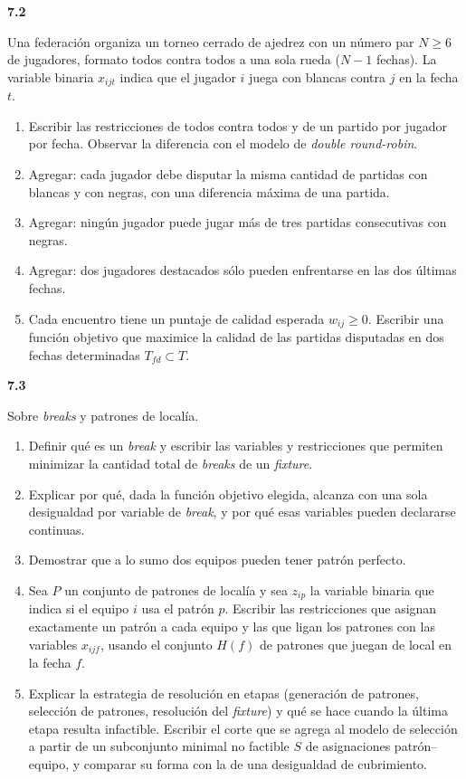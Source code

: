 \documentclass[11pt,a4paper]{article}
\newcommand{\ejercicio}[1]{\par\medskip\noindent\textbf{#1}\par\nopagebreak\smallskip}
\begin{document}
\ejercicio{7.2}
Una federación organiza un torneo cerrado de ajedrez con un número par $N \ge 6$
de jugadores, formato todos contra todos a una sola rueda ($N-1$ fechas). La
variable binaria $x_{ijt}$ indica que el jugador $i$ juega con blancas contra
$j$ en la fecha $t$.
\begin{enumerate}
  \item Escribir las restricciones de todos contra todos y de un partido por
  jugador por fecha. Observar la diferencia con el modelo de \emph{double
  round-robin}.
  \item Agregar: cada jugador debe disputar la misma cantidad de partidas con
  blancas y con negras, con una diferencia máxima de una partida.
  \item Agregar: ningún jugador puede jugar más de tres partidas consecutivas
  con negras.
  \item Agregar: dos jugadores destacados sólo pueden enfrentarse en las dos
  últimas fechas.
  \item Cada encuentro tiene un puntaje de calidad esperada $w_{ij} \ge 0$.
  Escribir una función objetivo que maximice la calidad de las partidas
  disputadas en dos fechas determinadas $T_{fd} \subset T$.
\end{enumerate}

\ejercicio{7.3}
Sobre \emph{breaks} y patrones de localía.
\begin{enumerate}
  \item Definir qué es un \emph{break} y escribir las variables y restricciones
  que permiten minimizar la cantidad total de \emph{breaks} de un
  \emph{fixture}.
  \item Explicar por qué, dada la función objetivo elegida, alcanza con una sola
  desigualdad por variable de \emph{break}, y por qué esas variables pueden
  declararse continuas.
  \item Demostrar que a lo sumo dos equipos pueden tener patrón perfecto.
  \item Sea $P$ un conjunto de patrones de localía y sea $z_{ip}$ la variable
  binaria que indica si el equipo $i$ usa el patrón $p$. Escribir las
  restricciones que asignan exactamente un patrón a cada equipo y las que ligan
  los patrones con las variables $x_{ijf}$, usando el conjunto $H(f)$ de
  patrones que juegan de local en la fecha $f$.
  \item Explicar la estrategia de resolución en etapas (generación de patrones,
  selección de patrones, resolución del \emph{fixture}) y qué se hace cuando la
  última etapa resulta infactible. Escribir el corte que se agrega al modelo de
  selección a partir de un subconjunto minimal no factible $S$ de asignaciones
  patrón--equipo, y comparar su forma con la de una desigualdad de cubrimiento.
\end{enumerate}
\end{document}
